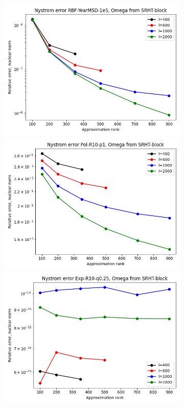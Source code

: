 \documentclass{article}
\theoremstyle{definition}
\begin{document}
\begin{figure}
\begin{subfigure}[t]{\textwidth+20pt\relax}
    \includegraphics[width=\dimexpr\linewidth-20pt\relax]{plots/relerror/relerror_RBF-YearMSD-1e5_SRHT-block.png}
    \includegraphics[width=\dimexpr\linewidth-20pt\relax]{plots/relerror/relerror_Pol-R10-p1_SRHT-block.png}
    \includegraphics[width=\dimexpr\linewidth-20pt\relax]{plots/relerror/relerror_Exp-R10-q0.25_SRHT-block.png}

\end{subfigure}
\end{figure}
\end{document}
